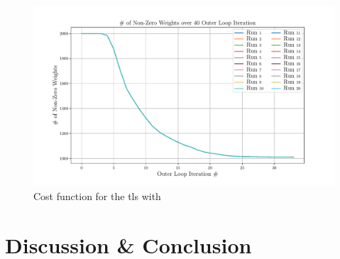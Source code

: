 \begin{figure}[!h]
	\begin{center}
		\includegraphics[width=\textwidth]{chapters/2-pose-estimation/fig/GNC-TLS-w-run-10-conv.pdf}
	\end{center}
	\caption{Cost function for the \gls{tls} with }
	\label{fig:GNC-TLS-w-run-conv}
\end{figure}


\section{Discussion \& Conclusion}\label{sec:2-pose-estimation-discussion}






